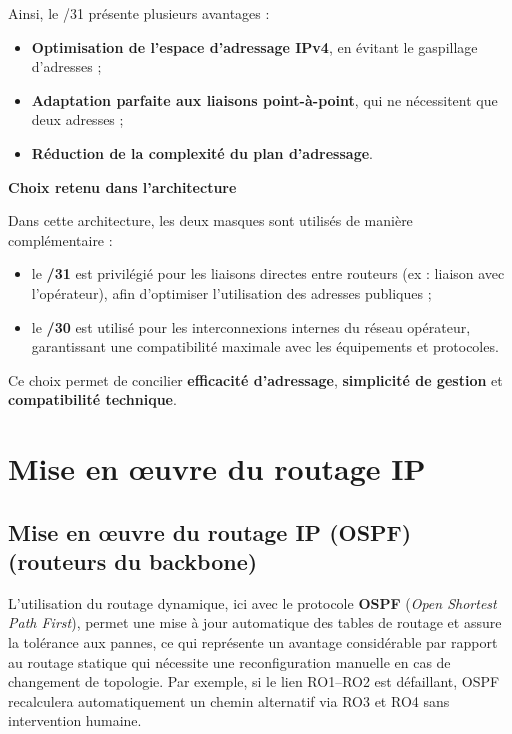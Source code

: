 \documentclass[12pt,a4paper, oneside]{memoir}
\begin{document}
Ainsi, le /31 présente plusieurs avantages :
\begin{itemize}
	\item \textbf{Optimisation de l’espace d’adressage IPv4}, en évitant le gaspillage d’adresses ;
	\item \textbf{Adaptation parfaite aux liaisons point-à-point}, qui ne nécessitent que deux adresses ;
	\item \textbf{Réduction de la complexité du plan d’adressage}.
\end{itemize}

\textbf{Choix retenu dans l’architecture}

Dans cette architecture, les deux masques sont utilisés de manière complémentaire :
\begin{itemize}
	\item le \textbf{/31} est privilégié pour les liaisons directes entre routeurs (ex : liaison avec l’opérateur), afin d’optimiser l’utilisation des adresses publiques ;
	\item le \textbf{/30} est utilisé pour les interconnexions internes du réseau opérateur, garantissant une compatibilité maximale avec les équipements et protocoles.
\end{itemize}

Ce choix permet de concilier \textbf{efficacité d’adressage}, \textbf{simplicité de gestion} et \textbf{compatibilité technique}.


\section{Mise en œuvre du routage IP}
\subsection{Mise en œuvre du routage IP (OSPF) (routeurs du backbone)}
L’utilisation du routage dynamique, ici avec le protocole \textbf{OSPF} (\textit{Open Shortest Path First}), permet une mise à jour automatique des tables de routage et assure la tolérance aux pannes, ce qui représente un avantage considérable par rapport au routage statique qui nécessite une reconfiguration manuelle en cas de changement de topologie. Par exemple, si le lien RO1–RO2 est défaillant, OSPF recalculera automatiquement un chemin alternatif via RO3 et RO4 sans intervention humaine. 
\end{document}
